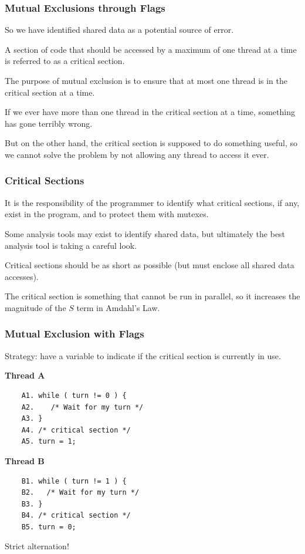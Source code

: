 \begin{frame}
\frametitle{Mutual Exclusions through Flags}

So we have identified shared data as a potential source of error. 

A section of code that should be accessed by a maximum of one thread at a time is referred to as a \alert{critical section}. 

The purpose of mutual exclusion is to ensure that at most one thread is in the critical section at a time. 

If we ever have more than one thread in the critical section at a time, something has gone terribly wrong. 

But on the other hand, the critical section is supposed to do something useful, so we cannot solve the problem by not allowing any thread to access it ever.

\end{frame}

\begin{frame}
\frametitle{Critical Sections}

It is the responsibility of the programmer to identify what critical sections, if any, exist in the program, and to protect them with mutexes. 

Some analysis tools may exist to identify shared data, but ultimately the best analysis tool is taking a careful look. 

Critical sections should be as short as possible (but must enclose all shared data accesses). 

The critical section is something that cannot be run in parallel, so it increases the magnitude of the $S$ term in Amdahl's Law.

\end{frame}

\begin{frame}[fragile]
\frametitle{Mutual Exclusion with Flags}

Strategy: have a variable to indicate if the critical section is currently in use.

\begin{multicols}{2}
\textbf{Thread A}
	\begin{verbatim}
	A1. while ( turn != 0 ) {
	A2.    /* Wait for my turn */
	A3. }
	A4. /* critical section */
	A5. turn = 1;
	\end{verbatim}
\columnbreak
\textbf{Thread B}
	\begin{verbatim}
	B1. while ( turn != 1 ) {
	B2.   /* Wait for my turn */
	B3. }
	B4. /* critical section */
	B5. turn = 0;
	\end{verbatim}
\end{multicols}

Strict alternation!

\end{frame}


